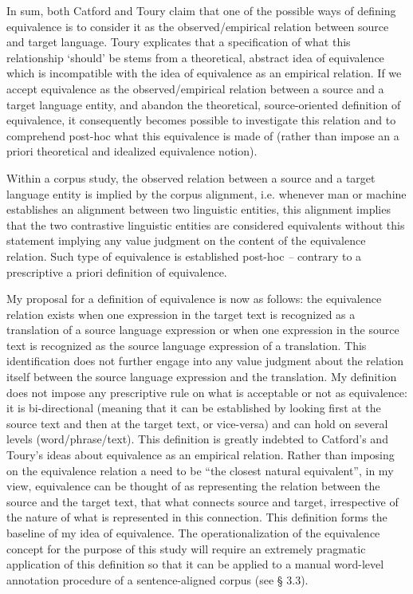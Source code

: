 In sum, both Catford and Toury claim that one of the possible ways of defining equivalence is to consider it as the observed/empirical relation between source and target language. Toury explicates that a specification of what this relationship ‘should’ be stems from a theoretical, abstract idea of equivalence which is incompatible with the idea of equivalence as an empirical relation. If we accept equivalence as the observed/empirical relation between a source and a target language entity, and abandon the theoretical, source-oriented definition of equivalence, it consequently becomes possible to investigate this relation and to comprehend post-hoc what this equivalence is made of (rather than impose an a priori theoretical and idealized equivalence notion).

Within a corpus study, the observed relation between a source and a target language entity is implied by the corpus alignment, i.e. whenever man or machine establishes an alignment between two linguistic entities, this alignment implies that the two contrastive linguistic entities are considered equivalents without this statement implying any value judgment on the content of the equivalence relation. Such type of equivalence is established post-hoc \textit{–} contrary to a prescriptive a priori definition of equivalence.

My proposal for a definition of equivalence is now as follows: the equivalence relation exists when one expression in the target text is recognized as a translation of a source language expression or when one expression in the source text is recognized as the source language expression of a translation. This identification does not further engage into any value judgment about the relation itself between the source language expression and the translation. My definition does not impose any prescriptive rule on what is acceptable or not as equivalence: it is bi-directional (meaning that it can be established by looking first at the source text and then at the target text, or vice-versa) and can hold on several levels (word/phrase/text). This definition is greatly indebted to Catford’s and Toury’s ideas about equivalence as an empirical relation. Rather than imposing on the equivalence relation a need to be “the closest natural equivalent”, in my view, equivalence can be thought of as representing the relation between the source and the target text, that what connects source and target, irrespective of the nature of what is represented in this connection. This definition forms the baseline of my idea of equivalence. The operationalization of the equivalence concept for the purpose of this study will require an extremely pragmatic application of this definition so that it can be applied to a manual word-level annotation procedure of a sentence-aligned corpus (see § 3.3).

